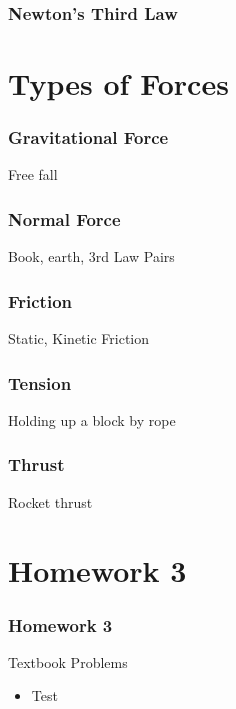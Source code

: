 \documentclass[20pt]{beamer}
\begin{document}
\begin{frame}
	\frametitle{Newton's Third Law}
\end{frame}

\section{Types of Forces}

\begin{frame}
	\frametitle{Gravitational Force}
	\begin{example}
		Free fall
	\end{example}
\end{frame}

\begin{frame}
	\frametitle{Normal Force}
	\begin{example}
		Book, earth, 3rd Law Pairs
	\end{example}
\end{frame}

\begin{frame}
	\frametitle{Friction}
	Static, Kinetic Friction
\end{frame}

\begin{frame}
	\frametitle{Tension}
	\begin{example}
		Holding up a block by rope
	\end{example}
\end{frame}

\begin{frame}
	\frametitle{Thrust}
	\begin{example}
		Rocket thrust
	\end{example}
\end{frame}

\section{Homework 3}

\begin{frame}
	\frametitle{Homework 3}
	\begin{block}{Textbook Problems}
		\begin{itemize}
			\item Test
		\end{itemize}
	\end{block}
\end{frame}
\end{document}
